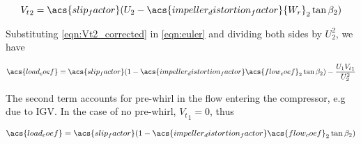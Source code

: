 \documentclass[tcc]{subfiles}
\begin{document}
\begin{equation}
    \label{eqn:Vt2_corrected}
    {V_t}_2 = \acs{slip_factor}(U_2 - \acs{impeller_distortion_factor}{W_r}_2 \tan\beta_2)
\end{equation}

Substituting \cref{eqn:Vt2_corrected} in \cref{eqn:euler} and dividing both sides by ${U_2^2}$, we have

\begin{equation}
    \acs{load_coef} = \acs{slip_factor}(1-\acs{impeller_distortion_factor}\acs{flow_coef}_2\tan\beta_2) - \frac{U_1 {V_t}_1}{U_2^2} 
\end{equation}

The second term accounts for pre-whirl in the flow entering the compressor, e.g due to \ac{IGV}.
In the case of no pre-whirl, ${V_t}_1 = 0$, thus 

\begin{equation}
    \acs{load_coef} = \acs{slip_factor}(1-\acs{impeller_distortion_factor}\acs{flow_coef}_2\tan\beta_2)  
\end{equation}
\end{document}
